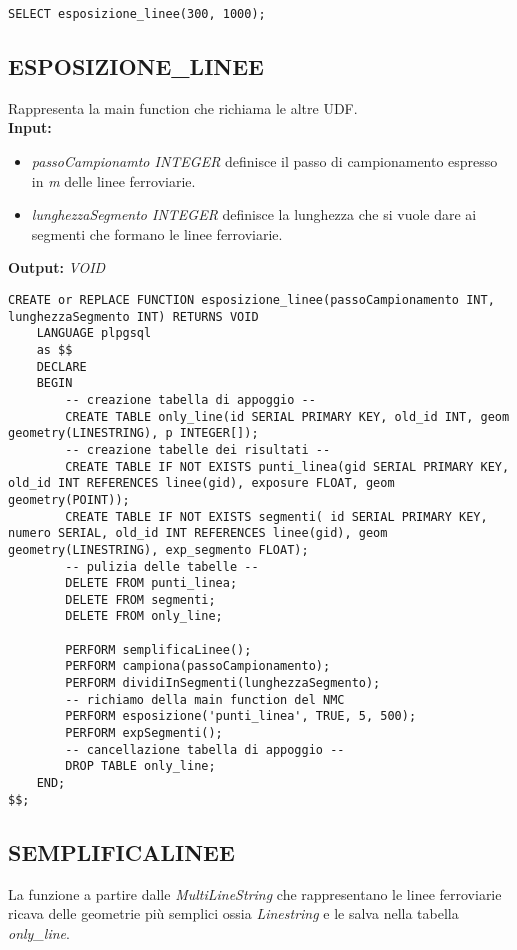 \begin{lstlisting}[style=mySQL]
SELECT esposizione_linee(300, 1000);
\end{lstlisting}     

\subsection{\textbf{ESPOSIZIONE\_LINEE}}
Rappresenta la main function che richiama le altre UDF.\\
\textbf{Input:} 
\begin{itemize}
\item \textit{passoCampionamto INTEGER} definisce il passo di campionamento espresso in \textit{m} delle linee ferroviarie.
\item \textit{lunghezzaSegmento INTEGER} definisce la lunghezza che si vuole dare ai segmenti che formano le linee ferroviarie.
\end{itemize}
\textbf{Output:} \textit{VOID} 

\begin{lstlisting}[style=mySQL]
CREATE or REPLACE FUNCTION esposizione_linee(passoCampionamento INT, lunghezzaSegmento INT) RETURNS VOID
	LANGUAGE plpgsql
	as $$
	DECLARE
	BEGIN
		-- creazione tabella di appoggio --
		CREATE TABLE only_line(id SERIAL PRIMARY KEY, old_id INT, geom geometry(LINESTRING), p INTEGER[]);
		-- creazione tabelle dei risultati --
		CREATE TABLE IF NOT EXISTS punti_linea(gid SERIAL PRIMARY KEY, old_id INT REFERENCES linee(gid), exposure FLOAT, geom geometry(POINT));
		CREATE TABLE IF NOT EXISTS segmenti( id SERIAL PRIMARY KEY, numero SERIAL, old_id INT REFERENCES linee(gid), geom geometry(LINESTRING), exp_segmento FLOAT);
		-- pulizia delle tabelle --
		DELETE FROM punti_linea;
		DELETE FROM segmenti;
		DELETE FROM only_line;
		
		PERFORM semplificaLinee();
		PERFORM campiona(passoCampionamento);
		PERFORM dividiInSegmenti(lunghezzaSegmento);
		-- richiamo della main function del NMC
		PERFORM esposizione('punti_linea', TRUE, 5, 500);
		PERFORM expSegmenti();
		-- cancellazione tabella di appoggio --
		DROP TABLE only_line;
	END;
$$;
\end{lstlisting}

\subsection{\textbf{SEMPLIFICALINEE}}
La funzione a partire dalle \textit{MultiLineString} che rappresentano le linee ferroviarie ricava delle geometrie più semplici ossia \textit{Linestring} e le salva nella tabella \textit{only\_line}.\\

